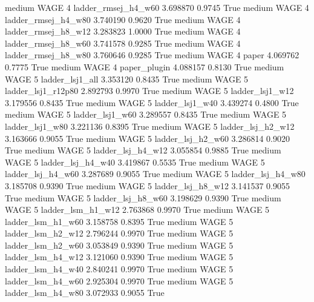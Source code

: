     medium     WAGE                 4    ladder_rmsej_h4_w60   3.698870      0.9745    True
    medium     WAGE                 4    ladder_rmsej_h4_w80   3.740190      0.9620    True
    medium     WAGE                 4    ladder_rmsej_h8_w12   3.283823      1.0000    True
    medium     WAGE                 4    ladder_rmsej_h8_w60   3.741578      0.9285    True
    medium     WAGE                 4    ladder_rmsej_h8_w80   3.760646      0.9285    True
    medium     WAGE                 4                  paper   4.069762      0.7775    True
    medium     WAGE                 4           paper_plugin   4.088157      0.8130    True
    medium     WAGE                 5        ladder_lsj1_all   3.353120      0.8435    True
    medium     WAGE                 5     ladder_lsj1_r12p80   2.892793      0.9970    True
    medium     WAGE                 5        ladder_lsj1_w12   3.179556      0.8435    True
    medium     WAGE                 5        ladder_lsj1_w40   3.439274      0.4800    True
    medium     WAGE                 5        ladder_lsj1_w60   3.289557      0.8435    True
    medium     WAGE                 5        ladder_lsj1_w80   3.221136      0.8395    True
    medium     WAGE                 5      ladder_lsj_h2_w12   3.163666      0.9055    True
    medium     WAGE                 5      ladder_lsj_h2_w60   3.286814      0.9020    True
    medium     WAGE                 5      ladder_lsj_h4_w12   3.055854      0.9885    True
    medium     WAGE                 5      ladder_lsj_h4_w40   3.419867      0.5535    True
    medium     WAGE                 5      ladder_lsj_h4_w60   3.287689      0.9055    True
    medium     WAGE                 5      ladder_lsj_h4_w80   3.185708      0.9390    True
    medium     WAGE                 5      ladder_lsj_h8_w12   3.141537      0.9055    True
    medium     WAGE                 5      ladder_lsj_h8_w60   3.198629      0.9390    True
    medium     WAGE                 5      ladder_lsm_h1_w12   2.763868      0.9970    True
    medium     WAGE                 5      ladder_lsm_h1_w60   3.158758      0.8395    True
    medium     WAGE                 5      ladder_lsm_h2_w12   2.796244      0.9970    True
    medium     WAGE                 5      ladder_lsm_h2_w60   3.053849      0.9390    True
    medium     WAGE                 5      ladder_lsm_h4_w12   3.121060      0.9390    True
    medium     WAGE                 5      ladder_lsm_h4_w40   2.840241      0.9970    True
    medium     WAGE                 5      ladder_lsm_h4_w60   2.925304      0.9970    True
    medium     WAGE                 5      ladder_lsm_h4_w80   3.072933      0.9055    True
